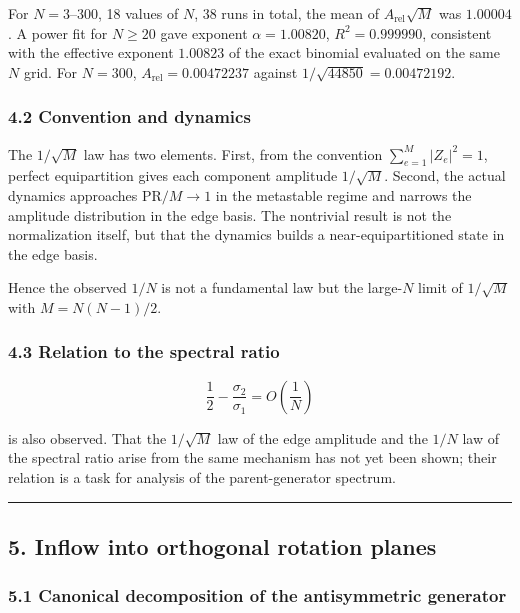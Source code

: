 \documentclass[
  a4paper,
]{article}
\begin{document}
For \(N=3\)--\(300\), 18 values of \(N\), 38 runs in total, the mean of
\(A_{\mathrm{rel}}\sqrt M\) was \(1.00004\). A power fit for \(N\ge20\)
gave exponent \(\alpha=1.00820\), \(R^2=0.999990\), consistent with the
effective exponent \(1.00823\) of the exact binomial evaluated on the
same \(N\) grid. For \(N=300\), \(A_{\mathrm{rel}}=0.00472237\) against
\(1/\sqrt{44850}=0.00472192\).

\subsubsection{4.2 Convention and
dynamics}\label{convention-and-dynamics}

The \(1/\sqrt M\) law has two elements. First, from the convention
\(\sum_{e=1}^{M}|Z_e|^2=1\), perfect equipartition gives each component
amplitude \(1/\sqrt M\). Second, the actual dynamics approaches
\(\mathrm{PR}/M\to1\) in the metastable regime and narrows the amplitude
distribution in the edge basis. The nontrivial result is not the
normalization itself, but that the dynamics builds a
near-equipartitioned state in the edge basis.

Hence the observed \(1/N\) is not a fundamental law but the large-\(N\)
limit of \(1/\sqrt M\) with \(M=N(N-1)/2\).

\subsubsection{4.3 Relation to the spectral
ratio}\label{relation-to-the-spectral-ratio}

\[
\frac12-\frac{\sigma_2}{\sigma_1}=O\!\left(\frac1N\right)
\]

is also observed. That the \(1/\sqrt M\) law of the edge amplitude and
the \(1/N\) law of the spectral ratio arise from the same mechanism has
not yet been shown; their relation is a task for analysis of the
parent-generator spectrum.

\begin{center}\rule{0.5\linewidth}{0.5pt}\end{center}

\subsection{5. Inflow into orthogonal rotation
planes}\label{inflow-into-orthogonal-rotation-planes}

\subsubsection{5.1 Canonical decomposition of the antisymmetric
generator}\label{canonical-decomposition-of-the-antisymmetric-generator}
\end{document}
